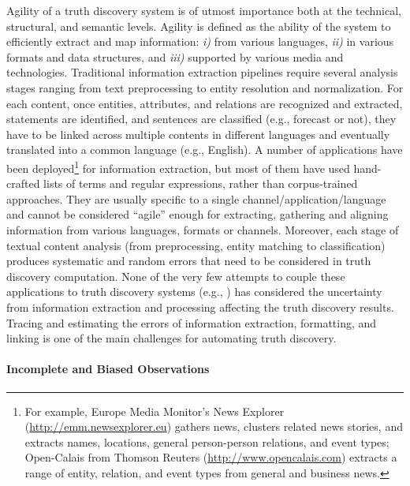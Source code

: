 \documentclass[prodmode,acmtecs]{acmsmall} %
\begin{document}
Agility of a truth discovery system is of utmost importance both at the technical, structural, and semantic levels. Agility is defined as the ability of the system to efficiently extract and map information: {\it i)} from various languages, {\it ii)} in various formats and data structures, and {\it iii)} supported by various media and technologies. Traditional information extraction pipelines  require several analysis stages ranging from text preprocessing %
 to entity resolution and normalization.  
For each content, once entities, attributes, and relations are recognized and extracted, statements are identified, and sentences are classified (e.g., forecast or not), they have to be linked across multiple contents in different languages and eventually translated into a common language (e.g., English). A number of applications have been deployed\footnote{\scriptsize{For example, Europe Media Monitor's News Explorer (\url{http://emm.newsexplorer.eu}) gathers news, clusters related news stories, and extracts names, locations, general person-person relations, and event types; Open-Calais from Thomson Reuters (\url{http://www.opencalais.com}) extracts a range of entity, relation, and event types from general and business news.}} for information extraction, but most of them have used hand-crafted lists of terms and regular expressions, rather than corpus-trained approaches. They are usually specific to a single channel/application/language and cannot be considered ``agile'' enough for extracting, gathering and 
aligning information from various languages, formats or channels.  Moreover, each stage of textual content analysis (from preprocessing, entity matching to classification) produces systematic and random errors that need to be considered in truth discovery computation. None of the very few attempts  to couple these applications to truth discovery systems (e.g., \cite{GoasdoueKKLMZ13}) has considered the uncertainty from information extraction and processing affecting the truth discovery results. Tracing and estimating the errors of information extraction, formatting, and linking  is one of the main challenges for automating truth discovery. 


\paragraph*{Incomplete and Biased Observations}  
\end{document}
